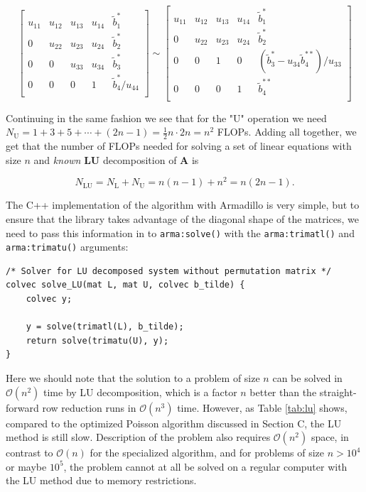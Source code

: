 \documentclass[]{article}
\begin{document}
\begin{equation*}
\left[ \begin{array}{cccc|c}
u_{11} & u_{12} & u_{13} & u_{14} & \tilde{b}_1^{\ast} \\
0 & u_{22} & u_{23} & u_{24} & \tilde{b}_2^{\ast} \\
0 & 0 & u_{33} & u_{34} & \tilde{b}_3^{\ast} \\
0 & 0 & 0 & 1 & \tilde{b}_4^{\ast}/u_{44} \\
\end{array} \right]
\sim
\left[ \begin{array}{cccc|c}
u_{11} & u_{12} & u_{13} & u_{14} & \tilde{b}_1^{\ast} \\
0 & u_{22} & u_{23} & u_{24} & \tilde{b}_2^{\ast} \\
0 & 0 & 1 & 0 & (\tilde{b}_3^{\ast} - u_{34}\tilde{b}_4^{\ast\ast})/u_{33} \\
0 & 0 & 0 & 1 & \tilde{b}_4^{\ast\ast} \\
\end{array} \right]
\end{equation*}

Continuing in the same fashion we see that for the "U" operation we need $N_{\text{U}} = 1+3+5+\cdots+(2n-1) = \frac{1}{2}n \cdot 2n = n^2$ FLOPs. Adding all together, we get that the number of FLOPs needed for solving a set of linear equations with size $n$ and \textit{known} $\mathbf{LU}$ decomposition of $\mathbf{A}$ is

\begin{equation*}
N_{\text{LU}} = N_{\text{L}} + N_{\text{U}} = n(n-1) + n^2 = n(2n-1) \text{.}
\end{equation*}

The C++ implementation of the algorithm with Armadillo is very simple, but to ensure that the library takes advantage of the diagonal shape of the matrices, we need to pass this information in to \lstinline|arma:solve()| with the \lstinline|arma:trimatl()| and \lstinline|arma:trimatu()| arguments:

\begin{lstlisting}
/* Solver for LU decomposed system without permutation matrix */
colvec solve_LU(mat L, mat U, colvec b_tilde) {
	colvec y;
	
	y = solve(trimatl(L), b_tilde);
	return solve(trimatu(U), y);
}
\end{lstlisting}

Here we should note that the solution to a problem of size $n$ can be solved in $\mathcal{O}(n^2)$ time by LU decomposition, which is a factor $n$ better than the straight-forward row reduction runs in $\mathcal{O}(n^3)$ time. However, as Table \ref{tab:lu} shows, compared to the optimized Poisson algorithm discussed in Section C, the LU method is still slow. Description of the problem also requires $\mathcal{O}(n^2)$ space, in contrast to $\mathcal{O}(n)$ for the specialized algorithm, and for problems of size $n > 10^4$ or maybe $10^5$, the problem cannot at all be solved on a regular computer with the LU method due to memory restrictions.
\end{document}
